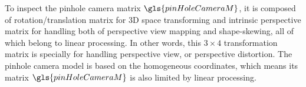 To inspect the pinhole camera matrix \(\gls{pinHoleCameraM}\), it is composed of rotation/translation matrix for \gls{3D} space transforming and intrinsic perspective matrix for handling both of perspective view mapping and shape-skewing, all of which belong to linear processing. In other words, this $3\times4$ transformation matrix is specially for handling perspective view, or perspective distortion. The pinhole camera model is based on the homogeneous coordinates, which means its matrix \(\gls{pinHoleCameraM}\) is also limited by linear processing.
   
